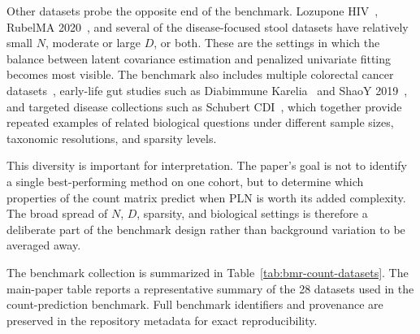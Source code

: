 \documentclass{jmlr}
\begin{document}
Other datasets probe the opposite end of the benchmark.
Lozupone HIV~\cite{Lozupone2013}, RubelMA 2020~\cite{Rubel2020}, and several of the disease-focused stool datasets have relatively small $N$, moderate or large $D$, or both.
These are the settings in which the balance between latent covariance estimation and penalized univariate fitting becomes most visible.
The benchmark also includes multiple colorectal cancer datasets~\cite{Yu2015, Baxter2016, Zeller2014}, early-life gut studies such as Diabimmune Karelia~\cite{Vatanen2016} and ShaoY 2019~\cite{Shao2019}, and targeted disease collections such as Schubert CDI~\cite{Schubert2014}, which together provide repeated examples of related biological questions under different sample sizes, taxonomic resolutions, and sparsity levels.

This diversity is important for interpretation.
The paper's goal is not to identify a single best-performing method on one cohort, but to determine which properties of the count matrix predict when PLN is worth its added complexity.
The broad spread of $N$, $D$, sparsity, and biological settings is therefore a deliberate part of the benchmark design rather than background variation to be averaged away.

The benchmark collection is summarized in Table~\ref{tab:bmr-count-datasets}.
The main-paper table reports a representative summary of the 28 datasets used in the count-prediction benchmark.
Full benchmark identifiers and provenance are preserved in the repository metadata for exact reproducibility.
\end{document}
